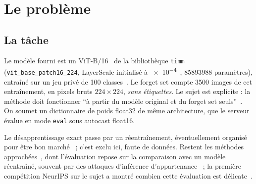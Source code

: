 \documentclass[11pt,a4paper]{article}
\newcommand{\code}[1]{\texttt{#1}}
\begin{document}
\section{Le problème}\label{sec:probleme}

\subsection{La tâche}
Le modèle fourni est un ViT-B/16~\cite{dosovitskiy2021} de la bibliothèque
\code{timm}~\cite{wightman2019timm} (\code{vit\_base\_patch16\_224}, LayerScale initialisé à
\num{e-4}~\cite{touvron2021cait}, \num{85893988} paramètres), entraîné sur un jeu privé de 100
classes~\cite{sujet2026,sprintml2026}. Le forget set compte \num{3500} images de cet entraînement,
en pixels bruts $224\times224$, \emph{sans étiquettes}. Le sujet est explicite : la méthode doit
fonctionner \enquote{à partir du modèle original et du forget set seuls}~\cite{sujet2026}. On
soumet un dictionnaire de poids float32 de même architecture, que le serveur évalue en mode
\code{eval} sous autocast float16.

Le désapprentissage exact passe par un réentraînement, éventuellement organisé pour être bon
marché~\cite{bourtoule2021} ; c'est exclu ici, faute de données. Restent les méthodes
approchées~\cite{golatkar2020,kurmanji2023,chundawat2023,fan2024salun,zhang2024npo}, dont
l'évaluation repose sur la comparaison avec un modèle réentraîné, souvent par des attaques
d'inférence d'appartenance~\cite{shokri2017,carlini2022} ; la première compétition NeurIPS sur
le sujet a montré combien cette évaluation est délicate~\cite{triantafillou2024}.
\end{document}
